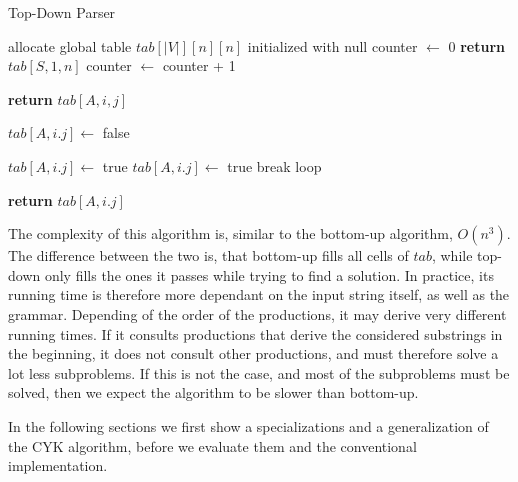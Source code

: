\begin{algorithm}[H]
    \caption{Top-Down Parser}
    \label{alg:td}
    \begin{algorithmic}[1]
        \State allocate global table $tab[|V|][n][n]$ initialized with null
        \State counter $\leftarrow$ 0
        \State {}
        \State \textbf{return} $tab[S,1,n]$
        \EndFunction
            \State counter $\leftarrow$ counter + 1

                \State \textbf{return} $tab[A,i,j]$
            \EndIf

            \State $tab[A,i.j]\leftarrow$ false

                    \State $tab[A,i.j]\leftarrow$ true
                \EndIf
            \Else
                         \label{lst:td_call}
                        \State $tab[A,i.j]\leftarrow$ true
                        \State break loop
                        \EndIf
                    \EndFor
                \EndFor
            \EndIf

            \State \textbf{return} $tab[A,i.j]$
        \EndFunction
    \end{algorithmic}
\end{algorithm}

The complexity of this algorithm is, similar to the bottom-up algorithm, $O(n^3)$.
The difference between the two is, that bottom-up fills all cells of $tab$, while top-down only fills the ones it passes while trying to find a solution.
In practice, its running time is therefore more dependant on the input string itself, as well as the grammar.
Depending of the order of the productions, it may derive very different running times.
If it consults productions that derive the considered substrings in the beginning, it does not consult other productions, and must therefore solve a lot less subproblems.
If this is not the case, and most of the subproblems must be solved, then we expect the algorithm to be slower than bottom-up.

In the following sections we first show a specializations and a generalization of the CYK algorithm, before we evaluate them and the conventional implementation.
 
